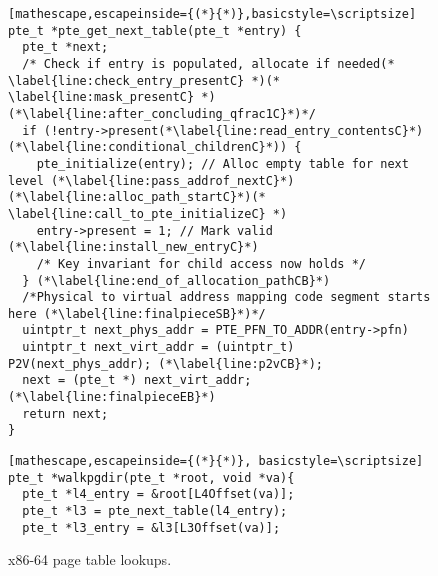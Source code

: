 \begin{figure}
\begin{subfigure}

          \caption{x86-64 page table lookups.}
        \label{fig:pagetables}
    \end{subfigure}
    \vfill
\begin{minipage}{.5\textwidth}
\begin{lstlisting}[mathescape,escapeinside={(*}{*)},basicstyle=\scriptsize]
pte_t *pte_get_next_table(pte_t *entry) {
  pte_t *next;
  /* Check if entry is populated, allocate if needed(* \label{line:check_entry_presentC} *)(* \label{line:mask_presentC} *)(*\label{line:after_concluding_qfrac1C}*)*/
  if (!entry->present(*\label{line:read_entry_contentsC}*) (*\label{line:conditional_childrenC}*)) {
    pte_initialize(entry); // Alloc empty table for next level (*\label{line:pass_addrof_nextC}*)(*\label{line:alloc_path_startC}*)(* \label{line:call_to_pte_initializeC} *)
    entry->present = 1; // Mark valid (*\label{line:install_new_entryC}*)
    /* Key invariant for child access now holds */
  } (*\label{line:end_of_allocation_pathCB}*)
  /*Physical to virtual address mapping code segment starts here (*\label{line:finalpieceSB}*)*/
  uintptr_t next_phys_addr = PTE_PFN_TO_ADDR(entry->pfn)
  uintptr_t next_virt_addr = (uintptr_t) P2V(next_phys_addr); (*\label{line:p2vCB}*);
  next = (pte_t *) next_virt_addr;(*\label{line:finalpieceEB}*)
  return next;
}
\end{lstlisting}
\end{minipage}
\hfill\hfill
\begin{minipage}{.4\textwidth}
\begin{lstlisting}[mathescape,escapeinside={(*}{*)}, basicstyle=\scriptsize]
pte_t *walkpgdir(pte_t *root, void *va){ 
  pte_t *l4_entry = &root[L4Offset(va)];
  pte_t *l3 = pte_next_table(l4_entry);
  pte_t *l3_entry = &l3[L3Offset(va)];

\end{lstlisting}
\end{minipage}
\end{figure}
